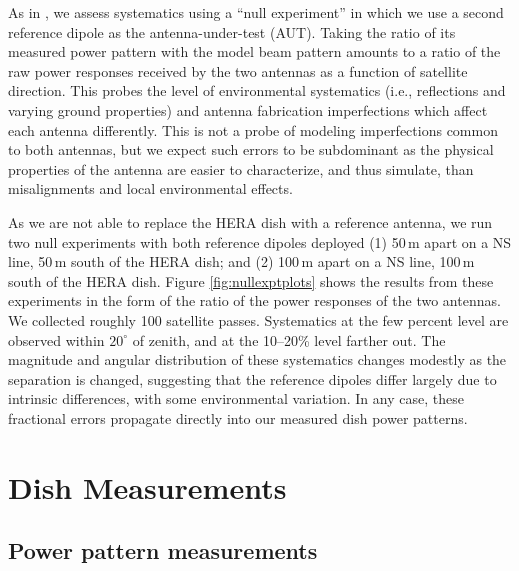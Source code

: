 \documentclass{emulateapj}
\begin{document}
As in \citet{neben15}, we assess systematics using a ``null experiment'' in which we use a second reference dipole as the antenna-under-test (AUT). Taking the ratio of its measured power pattern with the model beam pattern amounts to a ratio of the raw power responses received by the two antennas as a function of satellite direction. This probes the level of environmental systematics (i.e., reflections and varying ground properties) and antenna fabrication imperfections which affect each antenna differently. This is not a probe of modeling imperfections common to both antennas, but we expect such errors to be subdominant as the physical properties of the antenna are easier to characterize, and thus simulate, than misalignments and local environmental effects. 

As we are not able to replace the HERA dish with a reference antenna, we run two null experiments with both reference dipoles deployed (1) 50\,m apart on a NS line, 50\,m south of the HERA dish; and (2) 100\,m apart on a NS line, 100\,m south of the HERA dish. Figure \ref{fig:nullexptplots} shows the results from these experiments in the form of the ratio of the power responses of the two antennas. We collected roughly 100 satellite passes. Systematics at the few percent level are observed within $20^\circ$ of zenith, and at the 10--20\% level farther out. The magnitude and angular distribution of these systematics changes modestly as the separation is changed, suggesting that the reference dipoles differ largely due to intrinsic differences, with some environmental variation. In any case, these fractional errors propagate directly into our measured dish power patterns.

\section{Dish Measurements}

\subsection{Power pattern measurements}
\label{sec:powerpatternmeasurements}
\end{document}
